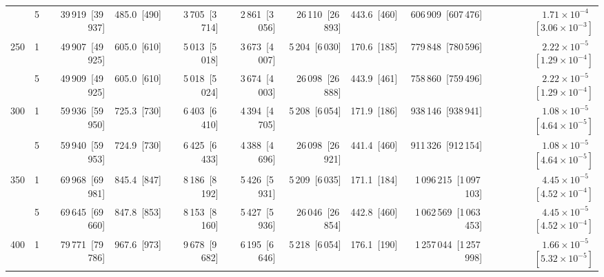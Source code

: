 \begin{tabular}{llrrrrrrrr}
 & 5 & 39\,919~{\footnotesize[39\,937]} & 485.0~{\footnotesize[490]} & 3\,705~{\footnotesize[3\,714]} & 2\,861~{\footnotesize[3\,056]} & 26\,110~{\footnotesize[26\,893]} & 443.6~{\footnotesize[460]} & 606\,909~{\footnotesize[607\,476]} & $1.71\!\times\!10^{-4}$~{\footnotesize $[3.06\!\times\!10^{-3}]$} \\
\cline{1-10}
\multirow[t]{2}{*}{250} & 1 & 49\,907~{\footnotesize[49\,925]} & 605.0~{\footnotesize[610]} & 5\,013~{\footnotesize[5\,018]} & 3\,673~{\footnotesize[4\,007]} & 5\,204~{\footnotesize[6\,030]} & 170.6~{\footnotesize[185]} & 779\,848~{\footnotesize[780\,596]} & $2.22\!\times\!10^{-5}$~{\footnotesize $[1.29\!\times\!10^{-4}]$} \\
 & 5 & 49\,909~{\footnotesize[49\,925]} & 605.0~{\footnotesize[610]} & 5\,018~{\footnotesize[5\,024]} & 3\,674~{\footnotesize[4\,003]} & 26\,098~{\footnotesize[26\,888]} & 443.9~{\footnotesize[461]} & 758\,860~{\footnotesize[759\,496]} & $2.22\!\times\!10^{-5}$~{\footnotesize $[1.29\!\times\!10^{-4}]$} \\
\cline{1-10}
\multirow[t]{2}{*}{300} & 1 & 59\,936~{\footnotesize[59\,950]} & 725.3~{\footnotesize[730]} & 6\,403~{\footnotesize[6\,410]} & 4\,394~{\footnotesize[4\,705]} & 5\,208~{\footnotesize[6\,054]} & 171.9~{\footnotesize[186]} & 938\,146~{\footnotesize[938\,941]} & $1.08\!\times\!10^{-5}$~{\footnotesize $[4.64\!\times\!10^{-5}]$} \\
 & 5 & 59\,940~{\footnotesize[59\,953]} & 724.9~{\footnotesize[730]} & 6\,425~{\footnotesize[6\,433]} & 4\,388~{\footnotesize[4\,696]} & 26\,098~{\footnotesize[26\,921]} & 441.4~{\footnotesize[460]} & 911\,326~{\footnotesize[912\,154]} & $1.08\!\times\!10^{-5}$~{\footnotesize $[4.64\!\times\!10^{-5}]$} \\
\cline{1-10}
\multirow[t]{2}{*}{350} & 1 & 69\,968~{\footnotesize[69\,981]} & 845.4~{\footnotesize[847]} & 8\,186~{\footnotesize[8\,192]} & 5\,426~{\footnotesize[5\,931]} & 5\,209~{\footnotesize[6\,035]} & 171.1~{\footnotesize[184]} & 1\,096\,215~{\footnotesize[1\,097\,103]} & $4.45\!\times\!10^{-5}$~{\footnotesize $[4.52\!\times\!10^{-4}]$} \\
 & 5 & 69\,645~{\footnotesize[69\,660]} & 847.8~{\footnotesize[853]} & 8\,153~{\footnotesize[8\,160]} & 5\,427~{\footnotesize[5\,936]} & 26\,046~{\footnotesize[26\,854]} & 442.8~{\footnotesize[460]} & 1\,062\,569~{\footnotesize[1\,063\,453]} & $4.45\!\times\!10^{-5}$~{\footnotesize $[4.52\!\times\!10^{-4}]$} \\
\cline{1-10}
\multirow[t]{2}{*}{400} & 1 & 79\,771~{\footnotesize[79\,786]} & 967.6~{\footnotesize[973]} & 9\,678~{\footnotesize[9\,682]} & 6\,195~{\footnotesize[6\,646]} & 5\,218~{\footnotesize[6\,054]} & 176.1~{\footnotesize[190]} & 1\,257\,044~{\footnotesize[1\,257\,998]} & $1.66\!\times\!10^{-5}$~{\footnotesize $[5.32\!\times\!10^{-5}]$} \\

\end{tabular}

